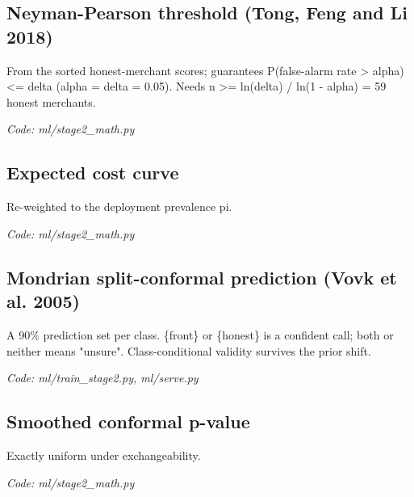 \documentclass[11pt,a4paper]{article}
\newcommand{\where}[1]{\par{\small\itshape\color{mute}Code: #1}\par}
\begin{document}
\subsection*{Neyman-Pearson threshold (Tong, Feng and Li 2018)}
\par\smallskip\noindent{}\par\smallskip
From the sorted honest-merchant scores; guarantees P(false-alarm rate \textgreater{} alpha) \textless{}= delta (alpha = delta = 0.05). Needs n \textgreater{}= ln(delta) / ln(1 - alpha) = 59 honest merchants.
\where{ml/stage2\_math.py}

\subsection*{Expected cost curve}
\par\smallskip\noindent{}\par\smallskip
Re-weighted to the deployment prevalence pi.
\where{ml/stage2\_math.py}

\subsection*{Mondrian split-conformal prediction (Vovk et al. 2005)}
\par\smallskip\noindent{}\par\smallskip
\par\smallskip\noindent{}\par\smallskip
A 90\% prediction set per class. \{front\} or \{honest\} is a confident call; both or neither means "unsure". Class-conditional validity survives the prior shift.
\where{ml/train\_stage2.py, ml/serve.py}

\subsection*{Smoothed conformal p-value}
\par\smallskip\noindent{}\par\smallskip
Exactly uniform under exchangeability.
\where{ml/stage2\_math.py}
\end{document}
